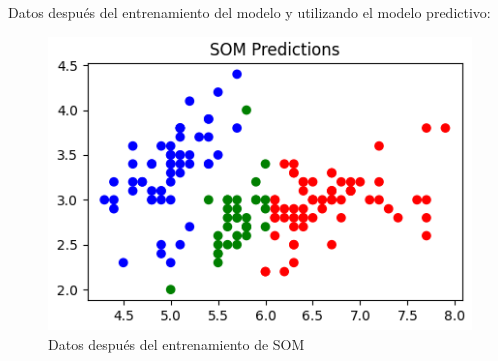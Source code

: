 Datos después del entrenamiento del modelo y utilizando el modelo predictivo:

\begin{center}
    \begin{figure}[!ht]
        \centering
        \includegraphics[scale=0.67]{After_SOM.png}
        \caption{Datos después del entrenamiento de SOM}
    \end{figure}
\end{center}
